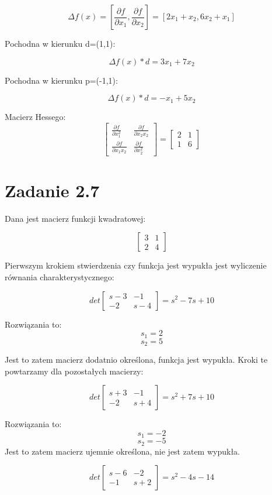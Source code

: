 \documentclass[paper=a4, fontsize=11pt]{scrartcl} %
\begin{document}
\[\Delta f(x)=[\frac{\partial f}{\partial x_1},\frac{\partial f}{\partial x_2}]=[2x_1+x_2,6x_2+x_1]\]

Pochodna w kierunku d=(1,1):

\[\Delta f(x) * d = 3x_1 + 7x_2\]

Pochodna w kierunku p=(-1,1):

\[\Delta f(x) * d = -x_1 + 5x_2\]

Macierz Hessego:
\[
\begin{bmatrix}
  \frac{\partial f}{\partial x_1^2} & \frac{\partial f}{\partial x_2x_2} \\
  \frac{\partial f}{\partial x_1x_2} & \frac{\partial f}{\partial x_2^2} 
 \end{bmatrix}
=
\begin{bmatrix}
  2 & 1 \\
  1 & 6 
 \end{bmatrix}
 \]
\newpage
\section{Zadanie 2.7}

Dana jest macierz funkcji kwadratowej:

\[
\begin{bmatrix}
  3 & 1 \\
  2 & 4 
\end{bmatrix}
\]

Pierwszym krokiem stwierdzenia czy funkcja jest wypukła jest wyliczenie równania charakterystycznego:

\[
det \begin{bmatrix}
  s - 3 & -1 \\
  -2 & s - 4 
\end{bmatrix}
= s^2 - 7s + 10 
\]

Rozwiązania to:
\[s_1=2\]
\[s_2=5\]

Jest to zatem macierz dodatnio określona, funkcja jest wypukła.
Kroki te powtarzamy dla pozostałych macierzy:

\[
det\begin{bmatrix}
  s+3 & -1 \\
  -2 & s+4 
\end{bmatrix}
= s^2 + 7s +10
\]

Rozwiązania to:
\[s_1=-2\]
\[s_2=-5\]
Jest to zatem macierz ujemnie określona, nie jest zatem wypukła.


\[
det\begin{bmatrix}
  s-6 & -2 \\
  -1 & s+2 
\end{bmatrix} = s^2 -4s - 14
\]
\end{document}
